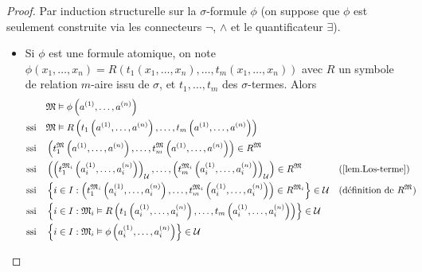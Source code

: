 \begin{proof}
	Par induction structurelle sur la $\sigma$-formule $\phi$ (on suppose que $\phi$ est seulement construite via les connecteurs $\neg$, $\land$ et le quantificateur $\exists$).
	\begin{itemize}
		\item Si $\phi$ est une formule atomique, on note $\phi\left(x_{1},\dots,x_{n}\right)=R\left(t_{1}\left(x_{1},\dots,x_{n}\right),\dots,t_{m}\left(x_{1},\dots,x_{n}\right)\right)$ avec $R$ un symbole de relation $m$-aire issu de $\sigma$, et $t_{1},\dots,t_{m}$ des $\sigma$-termes. Alors
		\begin{align*}
			&\quad\mathfrak{M}\vDash\phi\left(a^{\left(1\right)},\dots,a^{\left(n\right)}\right)\\
			\text{ssi}&\quad\mathfrak{M}\vDash R\left(t_{1}\left(a^{\left(1\right)},\dots,a^{\left(n\right)}\right),\dots,t_{m}\left(a^{\left(1\right)},\dots,a^{\left(n\right)}\right)\right)\\
			\text{ssi}&\quad\left(t_{1}^{\mathfrak{M}}\left(a^{\left(1\right)},\dots,a^{\left(n\right)}\right),\dots,t_{m}^{\mathfrak{M}}\left(a^{\left(1\right)},\dots,a^{\left(n\right)}\right)\right)\in R^{\mathfrak{M}}\\
			\text{ssi}&\quad\left(\left(t_{1}^{\mathfrak{M}_{i}}\left(a_{i}^{\left(1\right)},\dots,a_{i}^{\left(n\right)}\right)\right)_{\mathcal{U}},\dots,\left(t_{m}^{\mathfrak{M}_{i}}\left(a_{i}^{\left(1\right)},\dots,a_{i}^{\left(n\right)}\right)\right)_{\mathcal{U}}\right)\in R^{\mathfrak{M}}&&\text{(\cref{lem.Los-terme})}\\
			\text{ssi}&\quad\left\{i\in I:\left(t_{1}^{\mathfrak{M}_{i}}\left(a_{i}^{\left(1\right)},\dots,a_{i}^{\left(n\right)}\right),\dots,t_{m}^{\mathfrak{M}_{i}}\left(a_{i}^{\left(1\right)},\dots,a_{i}^{\left(n\right)}\right)\right)\in R^{\mathfrak{M}_{i}}\right\}\in\mathcal{U}&&\text{(définition de $R^{\mathfrak{M}}$)}\\
			\text{ssi}&\quad\left\{i\in I:\mathfrak{M}_{i}\vDash R\left(t_{1}\left(a_{i}^{\left(1\right)},\dots,a_{i}^{\left(n\right)}\right),\dots,t_{m}\left(a_{i}^{\left(1\right)},\dots,a_{i}^{\left(n\right)}\right)\right)\right\}\in\mathcal{U}\\
			\text{ssi}&\quad\left\{i\in I:\mathfrak{M}_{i}\vDash\phi\left(a_{i}^{\left(1\right)},\dots,a_{i}^{\left(n\right)}\right)\right\}\in\mathcal{U}
		\end{align*}
		

\end{itemize}
\end{proof}
